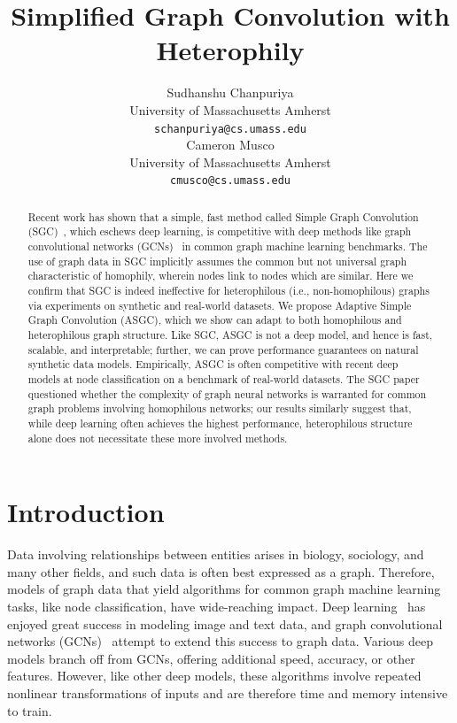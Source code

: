 \documentclass{article}
\title{Simplified Graph Convolution with Heterophily}
\author{%
  Sudhanshu Chanpuriya \\
  University of Massachusetts Amherst\\
  \texttt{schanpuriya@cs.umass.edu} \\
   \And
  Cameron Musco \\
  University of Massachusetts Amherst\\
  \texttt{cmusco@cs.umass.edu} \\
}
\begin{document}
\maketitle


\begin{abstract}
Recent work has shown that a simple, fast method called Simple Graph Convolution (SGC)~\citep{wu2019simplifying}, which eschews deep learning, is competitive with deep methods like graph convolutional networks (GCNs)~\citep{kipf2016semi} in common graph machine learning benchmarks. 
The use of graph data in SGC implicitly assumes the common but not universal graph characteristic of homophily, wherein nodes link to nodes which are similar. Here we confirm that SGC is indeed ineffective for heterophilous (i.e., non-homophilous) graphs via experiments on synthetic and real-world datasets. We propose Adaptive Simple Graph Convolution (ASGC), which we show can adapt to both homophilous and heterophilous graph structure. Like SGC, ASGC is not a deep model, and hence is fast, scalable, and interpretable; further, we can prove performance guarantees on natural synthetic data models.
Empirically, ASGC is often competitive with recent deep models at node classification on a benchmark of real-world datasets.
The SGC paper questioned whether the complexity of graph neural networks is warranted for common graph problems involving homophilous networks; our results similarly suggest that, while deep learning often achieves the highest performance, heterophilous structure alone does not necessitate these more involved methods.
\end{abstract}


\section{Introduction}
Data involving relationships between entities arises in biology, sociology, and many other fields, and such data is often best expressed as a graph. Therefore, models of graph data that yield algorithms for common graph machine learning tasks, like node classification, have wide-reaching impact.
Deep learning~\citep{lecun2015deep} has enjoyed great success in modeling image and text data, and graph convolutional networks (GCNs)~\citep{kipf2016semi} attempt to extend this success to graph data.
Various deep models branch off from GCNs, offering additional speed, accuracy, or other features.
However, like other deep models, these algorithms involve repeated nonlinear transformations of inputs and are therefore time and memory intensive to train. 
\end{document}
